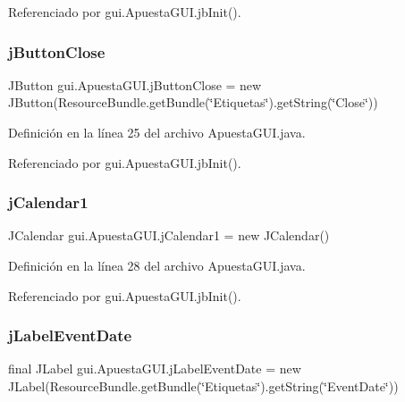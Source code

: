 Referenciado por gui.\+Apuesta\+G\+U\+I.\+jb\+Init().

\mbox{\label{classgui_1_1ApuestaGUI_abcd9daa679259596d9d75045bd184245}} 
\subsubsection{\texorpdfstring{jButtonClose}{jButtonClose}}
{\footnotesize\ttfamily J\+Button gui.\+Apuesta\+G\+U\+I.\+j\+Button\+Close = new J\+Button(Resource\+Bundle.\+get\+Bundle(\char`\"{}Etiquetas\char`\"{}).get\+String(\char`\"{}Close\char`\"{}))\hspace{0.3cm}{\ttfamily [private]}}



Definición en la línea 25 del archivo Apuesta\+G\+U\+I.\+java.



Referenciado por gui.\+Apuesta\+G\+U\+I.\+jb\+Init().

\mbox{\label{classgui_1_1ApuestaGUI_a8e68888312d4d5b98e78519783792a09}} 
\subsubsection{\texorpdfstring{jCalendar1}{jCalendar1}}
{\footnotesize\ttfamily J\+Calendar gui.\+Apuesta\+G\+U\+I.\+j\+Calendar1 = new J\+Calendar()\hspace{0.3cm}{\ttfamily [private]}}



Definición en la línea 28 del archivo Apuesta\+G\+U\+I.\+java.



Referenciado por gui.\+Apuesta\+G\+U\+I.\+jb\+Init().

\mbox{\label{classgui_1_1ApuestaGUI_a0fd9f96ea739167f2e8e801a269e66e0}} 
\subsubsection{\texorpdfstring{jLabelEventDate}{jLabelEventDate}}
{\footnotesize\ttfamily final J\+Label gui.\+Apuesta\+G\+U\+I.\+j\+Label\+Event\+Date = new J\+Label(Resource\+Bundle.\+get\+Bundle(\char`\"{}Etiquetas\char`\"{}).get\+String(\char`\"{}Event\+Date\char`\"{}))\hspace{0.3cm}{\ttfamily [private]}}



